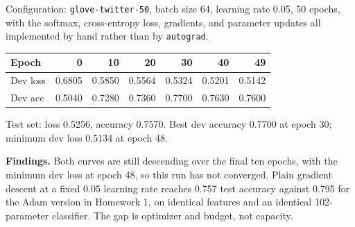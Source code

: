 \documentclass[11pt]{article}
\begin{document}
Configuration: \texttt{glove-twitter-50}, batch size 64, learning rate 0.05, 50 epochs, with the softmax,
cross-entropy loss, gradients, and parameter updates all implemented by hand rather than by
\texttt{autograd}.

\begin{center}
\begin{tabular}{|l|r|r|r|r|r|r|}
  \hline
  Epoch & 0 & 10 & 20 & 30 & 40 & 49 \\
  \hline
  Dev loss & 0.6805 & 0.5850 & 0.5564 & 0.5324 & 0.5201 & 0.5142 \\
  Dev acc & 0.5040 & 0.7280 & 0.7360 & 0.7700 & 0.7630 & 0.7600 \\
  \hline
\end{tabular}
\end{center}

Test set: loss 0.5256, accuracy 0.7570. Best dev accuracy 0.7700 at epoch 30; minimum dev loss 0.5134 at
epoch 48.

\textbf{Findings.}
Both curves are still descending over the final ten epochs, with the minimum dev loss at epoch 48, so this
run has not converged. Plain gradient descent at a fixed 0.05 learning rate reaches 0.757 test accuracy
against 0.795 for the Adam version in Homework 1, on identical features and an identical 102-parameter
classifier. The gap is optimizer and budget, not capacity.
\end{document}
